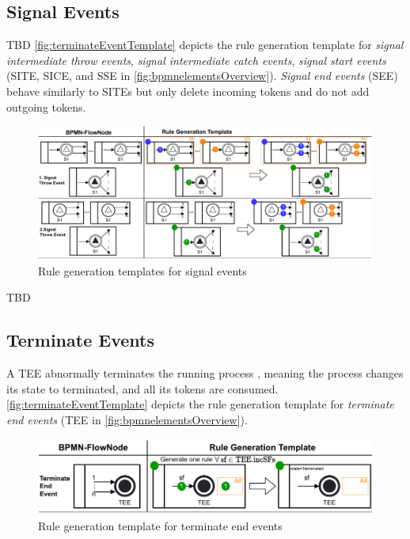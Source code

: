 \documentclass{lmcs} %
\theoremstyle{plain}\newtheorem{satz}[thm]{Satz} %
\begin{document}
\subsection{Signal Events}
TBD
\autoref{fig:terminateEventTemplate} depicts the rule generation template for \textit{signal intermediate throw events}, \textit{signal intermediate catch events}, \textit{signal start events} (\textsf{SITE}, \textsf{SICE}, and \textsf{SSE} in \autoref{fig:bpmnelementsOverview}).
\textit{Signal end events} (\textsf{SEE}) behave similarly to SITEs but only delete incoming tokens and do not add outgoing tokens.

\begin{figure}[ht]
    \centering
    \includegraphics[width=1\textwidth]{images/signal_rule_template.pdf}
    \caption{Rule generation templates for signal events}
    \label{fig:signalEventTemplates}
\end{figure}

TBD


\subsection{Terminate Events}
A TEE abnormally terminates the running process \cite{objectmanagementgroupBusinessProcessModel2013}, meaning the process changes its state to terminated, and all its tokens are consumed.
\autoref{fig:terminateEventTemplate} depicts the rule generation template for \textit{terminate end events} (\textsf{TEE} in \autoref{fig:bpmnelementsOverview}).

\begin{figure}[ht]
    \centering
    \includegraphics[width=1\textwidth]{images/terminate_end_event_template.pdf}
    \caption{Rule generation template for terminate end events}
    \label{fig:terminateEventTemplate}
\end{figure}
\end{document}
